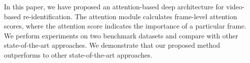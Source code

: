 \documentclass[sigconf, authordraft,review=false]{acmart}
\begin{document}
In this paper, we have proposed an attention-based deep
architecture  for  video-based  re-identification.   The  attention module calculates frame-level attention scores, where
the attention score indicates the importance of a particular
frame.  We perform
experiments on two benchmark datasets and compare with
other state-of-the-art approaches.  We demonstrate that our
proposed method outperforms to other state-of-the-art approaches.\\~\\\\~\\



\end{document}
